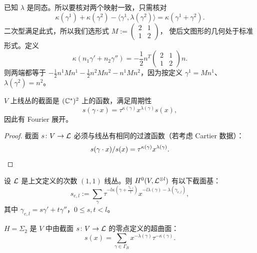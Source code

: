 已知 $\lambda$ 是同态。所以要核对两个映射一致，只需核对
\[
\kappa(\gamma^1)+\kappa(\gamma^2)-\langle\gamma^1,\lambda(\gamma^2)\rangle
=\kappa(\gamma^1+\gamma^2).
\]
二次型满足此式，所以我们选形式 $M:=\begin{pmatrix}2&1\\1&2\end{pmatrix}$，
使后文图形的几何处于标准形式。定义
\[
\kappa(n_1\gamma'+n_2\gamma'')=-\frac{1}{2}n^T
\begin{pmatrix}2&1\\1&2\end{pmatrix}n.
\]
则两端都等于
$-\frac{1}{2}n^1Mn^1-\frac{1}{2}n^2Mn^2-n^1Mn^2$，因为按定义 $\gamma^1=Mn^1$、
$\lambda(\gamma^2)=n^2$。


\begin{claim}\label{claim:sections-periodic}
$V$ 上线丛的截面是 $(\mathbb{C}^*)^2$ 上的函数，满足周期性
\[
s(\gamma\cdot x)=\tau^{\kappa(\gamma)}x^{\lambda(\gamma)}s(x),
\]
因此有 Fourier 展开。
\end{claim}

\begin{proof}
截面 $s\colon V\to\mathcal{L}$ 必须与线丛有相同的过渡函数（若考虑 Cartier 数据）：
\[
s(\gamma\cdot x)/s(x)=\tau^{\kappa(\gamma)}x^{\lambda(\gamma)}.\qedhere
\]
\end{proof}

\begin{corollary}\label{cor:basis-sections}
设 $\mathcal{L}$ 是上文定义的次数 $(1,1)$ 线丛。则 $H^0(V,\mathcal{L}^{\otimes l})$ 有以下截面基：
\[
s_{e,l} := \sum_{\gamma}\tau^{-l\kappa(\gamma+\frac{\gamma_{e,l}}{l})}
x^{-l\lambda(\gamma)-\lambda(\gamma_{e,l})},
\]
其中 $\gamma_{e,l}=s\gamma'+t\gamma''$，$0\le s,t<l$。
\end{corollary}

\begin{claim}[亏格 2 曲线]\label{claim:genus2-hypersurface}
$H=\Sigma_2$ 是 $V$ 中由截面 $s\colon V\to\mathcal{L}$ 的零点定义的超曲面：
\begin{equation}\label{eq:1-8}
s(x)=\sum_{\gamma\in\Gamma_B}x^{-\lambda(\gamma)}\tau^{-\kappa(\gamma)}.
\end{equation}
\end{claim}

